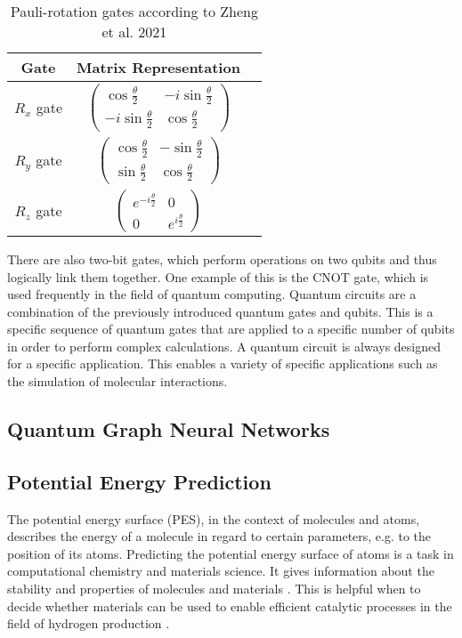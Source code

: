 \begin{table}[h!]
    \centering
    \captionsetup{justification=centering}
    \begin{tabular}{ccc}
    \hline
    \textbf{Gate} & \textbf{Matrix Representation} \\ 
    \hline
    $R_x$ gate & $\begin{pmatrix} \cos\frac{\theta}{2} & -i\sin\frac{\theta}{2} \\ -i\sin\frac{\theta}{2} & \cos\frac{\theta}{2} \end{pmatrix}$ \\ 
    $R_y$ gate & $\begin{pmatrix} \cos\frac{\theta}{2} & -\sin\frac{\theta}{2} \\ \sin\frac{\theta}{2} & \cos\frac{\theta}{2} \end{pmatrix}$ \\ 
    $R_z$ gate & $\begin{pmatrix} e^{-i\frac{\theta}{2}} & 0 \\ 0 & e^{i\frac{\theta}{2}} \end{pmatrix}$ \\ 
    \hline
    \end{tabular}
    \caption[Pauli-rotation gates according to Zheng et al. 2021]{\label{tab:pauligates} Pauli-rotation gates according to Zheng et al. 2021 \cite{zheng2021quantum}}
\end{table}

There are also two-bit gates, which perform operations on two qubits and thus logically link them together. One example of this is the CNOT gate, which is used frequently in the field of quantum computing. \cite{zheng2021quantum} Quantum circuits are a combination of the previously introduced quantum gates and qubits. This is a specific sequence of quantum gates that are applied to a specific number of qubits in order to perform complex calculations. A quantum circuit is always designed for a specific application. This enables a variety of specific applications such as the simulation of molecular interactions. \cite{claudino2022basics}

\subsection{Quantum Graph Neural Networks}
\subsection{Potential Energy Prediction}
The potential energy surface (PES), in the context of molecules and atoms, describes the energy of a molecule in regard to certain parameters, e.g. to the position of its atoms.    
Predicting the potential energy surface of atoms is a task in computational chemistry and materials science. It gives information about the stability and properties of molecules and materials \cite{liu_computational_2023}. This is helpful when to decide whether materials can be used to enable efficient catalytic processes in the field of hydrogen production \cite{chen_waste-derived_2023}. 


